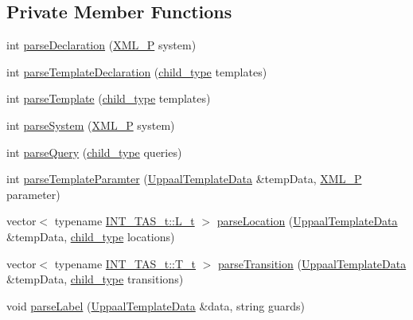 \subsection*{Private Member Functions}
\begin{DoxyCompactItemize}
\item 
int \mbox{\hyperlink{classgraphsat_1_1_uppaal_parser_a5234eff5f12d53358893072e421fb108}{parse\+Declaration}} (\mbox{\hyperlink{namespacegraphsat_a94de7ec8ce4b5d6bc48bdc19e58b2d76}{X\+M\+L\+\_\+P}} system)
\item 
int \mbox{\hyperlink{classgraphsat_1_1_uppaal_parser_a458fdbf8c38c19215b191bc6a992d38e}{parse\+Template\+Declaration}} (\mbox{\hyperlink{namespacegraphsat_aba2f5cf076d49898cc0469bee94d3a05}{child\+\_\+type}} templates)
\item 
int \mbox{\hyperlink{classgraphsat_1_1_uppaal_parser_a65d4465e1a96053627ef222a05a22356}{parse\+Template}} (\mbox{\hyperlink{namespacegraphsat_aba2f5cf076d49898cc0469bee94d3a05}{child\+\_\+type}} templates)
\item 
int \mbox{\hyperlink{classgraphsat_1_1_uppaal_parser_ac9dd720630e0d655635396e651d13465}{parse\+System}} (\mbox{\hyperlink{namespacegraphsat_a94de7ec8ce4b5d6bc48bdc19e58b2d76}{X\+M\+L\+\_\+P}} system)
\item 
int \mbox{\hyperlink{classgraphsat_1_1_uppaal_parser_a100e59360c8910f1dad2f0646255ffcc}{parse\+Query}} (\mbox{\hyperlink{namespacegraphsat_aba2f5cf076d49898cc0469bee94d3a05}{child\+\_\+type}} queries)
\item 
int \mbox{\hyperlink{classgraphsat_1_1_uppaal_parser_ad22c12325a60e719980d25c6368a7b7c}{parse\+Template\+Paramter}} (\mbox{\hyperlink{classgraphsat_1_1_uppaal_template_data}{Uppaal\+Template\+Data}} \&temp\+Data, \mbox{\hyperlink{namespacegraphsat_a94de7ec8ce4b5d6bc48bdc19e58b2d76}{X\+M\+L\+\_\+P}} parameter)
\item 
vector$<$ typename \mbox{\hyperlink{classgraphsat_1_1_t_a_s_a34bf8786372c42fbf45e9d3274a5e325}{I\+N\+T\+\_\+\+T\+A\+S\+\_\+t\+::\+L\+\_\+t}} $>$ \mbox{\hyperlink{classgraphsat_1_1_uppaal_parser_a7d6c4e8f548cf5abe26ea192eaf4a0e2}{parse\+Location}} (\mbox{\hyperlink{classgraphsat_1_1_uppaal_template_data}{Uppaal\+Template\+Data}} \&temp\+Data, \mbox{\hyperlink{namespacegraphsat_aba2f5cf076d49898cc0469bee94d3a05}{child\+\_\+type}} locations)
\item 
vector$<$ typename \mbox{\hyperlink{classgraphsat_1_1_t_a_s_abbc05c03de984fb78282fd1feaf13c41}{I\+N\+T\+\_\+\+T\+A\+S\+\_\+t\+::\+T\+\_\+t}} $>$ \mbox{\hyperlink{classgraphsat_1_1_uppaal_parser_a2d1d7098418df34e9ae1e97a23b96e1c}{parse\+Transition}} (\mbox{\hyperlink{classgraphsat_1_1_uppaal_template_data}{Uppaal\+Template\+Data}} \&temp\+Data, \mbox{\hyperlink{namespacegraphsat_aba2f5cf076d49898cc0469bee94d3a05}{child\+\_\+type}} transitions)
\item 
void \mbox{\hyperlink{classgraphsat_1_1_uppaal_parser_a33d35bb79055b36cf00b281a63265a41}{parse\+Label}} (\mbox{\hyperlink{classgraphsat_1_1_uppaal_template_data}{Uppaal\+Template\+Data}} \&data, string guards)
\end{DoxyCompactItemize}
